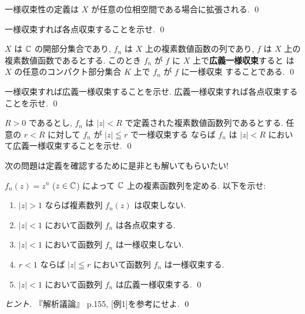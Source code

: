 \documentclass[12pt,twoside]{jarticle}
\begin{document}
\begin{rem}[位相空間について知っている人へ]
 一様収束性の定義は $X$ が任意の位相空間である場合に拡張される. \qed
\end{rem}

\begin{question}[易しい]
 一様収束すれば各点収束することを示せ. \qed
\end{question}

\begin{definition}[函数列の広義一様収束]
 $X$ は ${\mathbb C}$ の開部分集合であり, $f_n$ は $X$ 上の複素数値函数の列であり, 
 $f$ は $X$ 上の複素数値函数であるとする.
 このとき $f_n$ が $f$ に $X$ 上で{\bf 広義一様収束}すると
 は $X$ の任意のコンパクト部分集合 $K$ 上で $f_n$ が $f$ に一様収束
 することである.
 \qed
\end{definition}

\begin{question}[易しい]
 一様収束すれば広義一様収束することを示せ.
 広義一様収束すれば各点収束することを示せ.
 \qed
\end{question}

\begin{question}
 $R>0$ であるとし, %
 $f_n$ は $|z|<R$ で定義された複素数値函数列であるとする.
 任意の $r<R$ に対して $f_n$ が $|z|\leqq r$ で一様収束する
 ならば $f_n$ は $|z|<R$ において広義一様収束することを示せ.
 \qed
\end{question}

{\large 次の問題は定義を確認するために是非とも解いてもらいたい!}

\begin{question}[三種類の収束の定義の確認, 20点]
 $f_n(z)=z^n$ ($z\in{\mathbb C}$) によって ${\mathbb C}$ 上の複素函数列を定める.
 以下を示せ:
 \begin{enumerate}
  \item $|z|>1$ ならば複素数列 $f_n(z)$ は収束しない.
  \item $|z|<1$ において函数列 $f_n$ は各点収束する.
  \item $|z|<1$ において函数列 $f_n$ は一様収束しない.
  \item $r<1$ ならば $|z|\leqq r$ において函数列 $f_n$ は一様収束する.
  \item $|z|<1$ において函数列 $f_n$ は広義一様収束する.
  \qed
 \end{enumerate}
\end{question}

\begin{proof}[ヒント]
 『解析議論』\cite{takagi} p.155, [例1]を参考にせよ.
 \qed
\end{proof}
\end{document}

